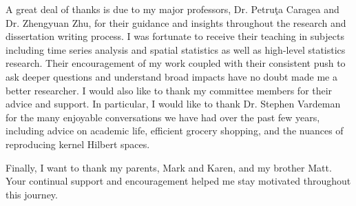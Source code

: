 A great deal of thanks is due to my major professors, Dr. Petru\c{t}a Caragea and Dr. Zhengyuan Zhu, for their guidance and insights throughout the research and dissertation writing process. I was fortunate to receive their teaching in subjects including time series analysis and spatial statistics as well as high-level statistics research. Their encouragement of my work coupled with their consistent push to ask deeper questions and understand broad impacts have no doubt made me a better researcher. I would also like to thank my committee members for their advice and support. In particular, I would like to thank Dr. Stephen Vardeman for the many enjoyable conversations we have had over the past few years, including advice on academic life, efficient grocery shopping, and the nuances of reproducing kernel Hilbert spaces. 

Finally, I want to thank my parents, Mark and Karen, and my brother Matt. Your continual support and encouragement helped me stay motivated throughout this journey. 

